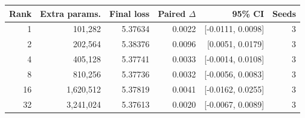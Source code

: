 \begin{tabular}{rrrrrr}
\toprule
Rank & Extra params. & Final loss & Paired $\Delta$ & 95\% CI & Seeds \\
\midrule
1 & 101{,}282 & 5.37634 & 0.0022 & [-0.0111, 0.0098] & 3 \\
2 & 202{,}564 & 5.38376 & 0.0096 & [0.0051, 0.0179] & 3 \\
4 & 405{,}128 & 5.37741 & 0.0033 & [-0.0014, 0.0108] & 3 \\
8 & 810{,}256 & 5.37736 & 0.0032 & [-0.0056, 0.0083] & 3 \\
16 & 1{,}620{,}512 & 5.37819 & 0.0041 & [-0.0162, 0.0255] & 3 \\
32 & 3{,}241{,}024 & 5.37613 & 0.0020 & [-0.0067, 0.0089] & 3 \\
\bottomrule
\end{tabular}
